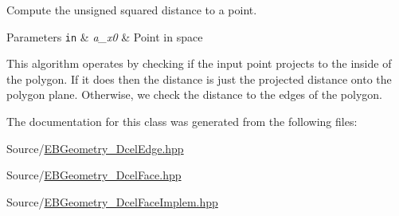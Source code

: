 Compute the unsigned squared distance to a point. 


\begin{DoxyParams}[1]{Parameters}
\mbox{\tt in}  & {\em a\+\_\+x0} & Point in space\\
\hline
\end{DoxyParams}
This algorithm operates by checking if the input point projects to the inside of the polygon. If it does then the distance is just the projected distance onto the polygon plane. Otherwise, we check the distance to the edges of the polygon. 

The documentation for this class was generated from the following files\+:\begin{DoxyCompactItemize}
\item 
Source/\hyperlink{EBGeometry__DcelEdge_8hpp}{E\+B\+Geometry\+\_\+\+Dcel\+Edge.\+hpp}\item 
Source/\hyperlink{EBGeometry__DcelFace_8hpp}{E\+B\+Geometry\+\_\+\+Dcel\+Face.\+hpp}\item 
Source/\hyperlink{EBGeometry__DcelFaceImplem_8hpp}{E\+B\+Geometry\+\_\+\+Dcel\+Face\+Implem.\+hpp}\end{DoxyCompactItemize}
